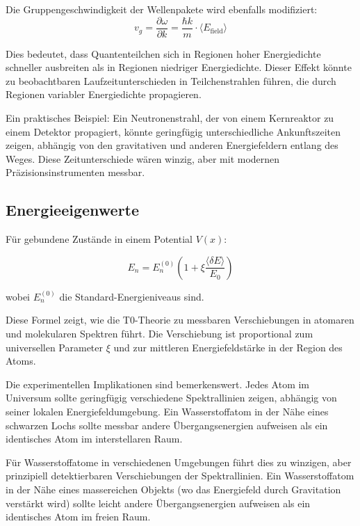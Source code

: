 \documentclass[12pt,a4paper]{article}
\newcommand{\deltaE}{\delta E}
\newcommand{\xipar}{\xi}
\theoremstyle{definition}
\theoremstyle{remark}
\begin{document}
Die Gruppengeschwindigkeit der Wellenpakete wird ebenfalls modifiziert:
$$v_g = \frac{\partial \omega}{\partial k} = \frac{\hbar k}{m} \cdot \langle E_{\text{field}} \rangle$$

Dies bedeutet, dass Quantenteilchen sich in Regionen hoher Energiedichte schneller ausbreiten als in Regionen niedriger Energiedichte. Dieser Effekt könnte zu beobachtbaren Laufzeitunterschieden in Teilchenstrahlen führen, die durch Regionen variabler Energiedichte propagieren.

Ein praktisches Beispiel: Ein Neutronenstrahl, der von einem Kernreaktor zu einem Detektor propagiert, könnte geringfügig unterschiedliche Ankunftszeiten zeigen, abhängig von den gravitativen und anderen Energiefeldern entlang des Weges. Diese Zeitunterschiede wären winzig, aber mit modernen Präzisionsinstrumenten messbar.

\subsection{Energieeigenwerte}

Für gebundene Zustände in einem Potential $V(x)$:

\begin{equation}
	E_n = E_n^{(0)} \left(1 + \xipar \frac{\langle \deltaE \rangle}{E_0}\right)
	\label{eq:energy_shift}
\end{equation}

wobei $E_n^{(0)}$ die Standard-Energieniveaus sind.

Diese Formel zeigt, wie die T0-Theorie zu messbaren Verschiebungen in atomaren und molekularen Spektren führt. Die Verschiebung ist proportional zum universellen Parameter $\xipar$ und zur mittleren Energiefeldstärke in der Region des Atoms.

Die experimentellen Implikationen sind bemerkenswert. Jedes Atom im Universum sollte geringfügig verschiedene Spektrallinien zeigen, abhängig von seiner lokalen Energiefeldumgebung. Ein Wasserstoffatom in der Nähe eines schwarzen Lochs sollte messbar andere Übergangsenergien aufweisen als ein identisches Atom im interstellaren Raum.

Für Wasserstoffatome in verschiedenen Umgebungen führt dies zu winzigen, aber prinzipiell detektierbaren Verschiebungen der Spektrallinien. Ein Wasserstoffatom in der Nähe eines massereichen Objekts (wo das Energiefeld durch Gravitation verstärkt wird) sollte leicht andere Übergangsenergien aufweisen als ein identisches Atom im freien Raum.
\end{document}

